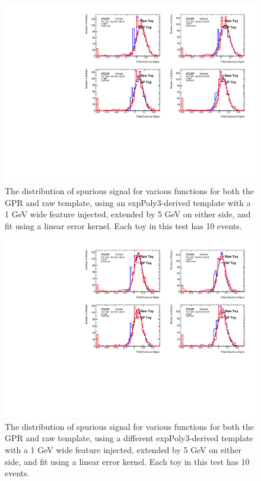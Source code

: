 \begin{figure} 
\begin{center}
  \includegraphics[width=\textwidth]{figures/background/gpr/validation/linear/ToyTest_FitSigVals_medpT_10_Sig_1s}   
\caption{The distribution of spurious signal for various functions for both the GPR and raw template, using an expPoly3-derived template with a 1 GeV wide feature injected, extended by 5 GeV on either side, and fit using a linear error kernel. Each toy in this test has 10 events.}
\label{fig:linearkernel_medpt_10_Sig_1s}
\end{center}
\end{figure}

\begin{figure} 
\begin{center}
  \includegraphics[width=\textwidth]{figures/background/gpr/validation/linear/ToyTest_FitSigVals_highpT_10_Sig_1s}   
\caption{The distribution of spurious signal for various functions for both the GPR and raw template, using a different expPoly3-derived template with a 1 GeV wide feature injected, extended by 5 GeV on either side, and fit using a linear error kernel. Each toy in this test has 10 events.}
\label{fig:linearkernel_highpt_10_Sig_1s}
\end{center}
\end{figure}

